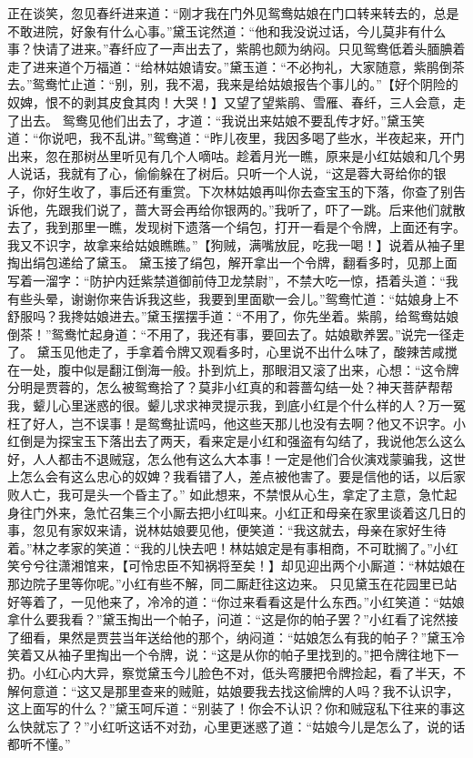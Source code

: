 \documentclass[12pt,oneside]{book}
\begin{document}
正在谈笑，忽见春纤进来道：“刚才我在门外见鸳鸯姑娘在门口转来转去的，总是不敢进院，好象有什么心事。”黛玉诧然道：“他和我没说过话，今儿莫非有什么事？快请了进来。”春纤应了一声出去了，紫鹃也颇为纳闷。只见鸳鸯低着头腼腆着走了进来道个万福道：“给林姑娘请安。”黛玉道：“不必拘礼，大家随意，紫鹃倒茶去。”鸳鸯忙止道：“别，别，我不渴，我来是给姑娘报告个事儿的。”【好个阴险的奴婢，恨不的剥其皮食其肉！大哭！】又望了望紫鹃、雪雁、春纤，三人会意，走了出去。
鸳鸯见他们出去了，才道：“我说出来姑娘不要乱传才好。”黛玉笑道：“你说吧，我不乱讲。”鸳鸯道：“昨儿夜里，我因多喝了些水，半夜起来，开门出来，忽在那树丛里听见有几个人嘀咕。趁着月光一瞧，原来是小红姑娘和几个男人说话，我就有了心，偷偷躲在了树后。只听一个人说，“这是蓉大哥给你的银子，你好生收了，事后还有重赏。下次林姑娘再叫你去查宝玉的下落，你查了别告诉他，先跟我们说了，蔷大哥会再给你银两的。”我听了，吓了一跳。后来他们就散去了，我到那里一瞧，发现树下遗落一个绢包，打开一看是个令牌，上面还有字。我又不识字，故拿来给姑娘瞧瞧。”【狗贼，满嘴放屁，吃我一喝！】说着从袖子里掏出绢包递给了黛玉。
黛玉接了绢包，解开拿出一个令牌，翻看多时，见那上面写着一溜字：“防护内廷紫禁道御前侍卫龙禁尉”，不禁大吃一惊，捂着头道：“我有些头晕，谢谢你来告诉我这些，我要到里面歇一会儿。”鸳鸯忙道：“姑娘身上不舒服吗？我搀姑娘进去。”黛玉摆摆手道：“不用了，你先坐着。紫鹃，给鸳鸯姑娘倒茶！”鸳鸯忙起身道：“不用了，我还有事，要回去了。姑娘歇养罢。”说完一径走了。
黛玉见他走了，手拿着令牌又观看多时，心里说不出什么味了，酸辣苦咸搅在一处，腹中似是翻江倒海一般。扑到炕上，那眼泪又滚了出来，心想：“这令牌分明是贾蓉的，怎么被鸳鸯拾了？莫非小红真的和蓉蔷勾结一处？神天菩萨帮帮我，颦儿心里迷惑的很。颦儿求求神灵提示我，到底小红是个什么样的人？万一冤枉了好人，岂不误事！是鸳鸯扯谎吗，他这些天那儿也没有去啊？他又不识字。小红倒是为探宝玉下落出去了两天，看来定是小红和强盗有勾结了，我说他怎么这么好，人人都击不退贼寇，怎么他有这么大本事！一定是他们合伙演戏蒙骗我，这世上怎么会有这么忠心的奴婢？我看错了人，差点被他害了。要是信他的话，以后家败人亡，我可是头一个昏主了。”
如此想来，不禁恨从心生，拿定了主意，急忙起身往门外来，急忙召集三个小厮去把小红叫来。小红正和母亲在家里谈着这几日的事，忽见有家奴来请，说林姑娘要见他，便笑道：“我这就去，母亲在家好生待着。”林之孝家的笑道：“我的儿快去吧！林姑娘定是有事相商，不可耽搁了。”小红笑兮兮往潇湘馆来，【可怜忠臣不知祸将至矣！】却见迎出两个小厮道：“林姑娘在那边院子里等你呢。”小红有些不解，同二厮赶往这边来。
只见黛玉在花园里已站好等着了，一见他来了，冷冷的道：“你过来看看这是什么东西。”小红笑道：“姑娘拿什么要我看？”黛玉掏出一个帕子，问道：“这是你的帕子罢？”小红看了诧然接了细看，果然是贾芸当年送给他的那个，纳闷道：“姑娘怎么有我的帕子？”黛玉冷笑着又从袖子里掏出一个令牌，说：“这是从你的帕子里找到的。”把令牌往地下一扔。小红心内大异，察觉黛玉今儿脸色不对，低头弯腰把令牌捡起，看了半天，不解何意道：“这又是那里查来的贼赃，姑娘要我去找这偷牌的人吗？我不认识字，这上面写的什么？”黛玉呵斥道：“别装了！你会不认识？你和贼寇私下往来的事这么快就忘了？”小红听这话不对劲，心里更迷惑了道：“姑娘今儿是怎么了，说的话都听不懂。”
\end{document}

